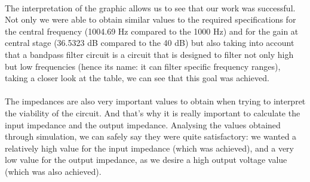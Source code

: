 \paragraph{}
The interpretation of the graphic allows us to see that our work was successful. Not only we were able to obtain similar values to the required specifications for the central frequency (1004.69 Hz compared to the 1000 Hz) and for the gain at central stage (36.5323 dB compared to the 40 dB) but also taking into account that a bandpass filter circuit is a circuit that is designed to filter not only high but low frequencies (hence its name: it can filter specific frequency ranges), taking a closer look at the table, we can see that this goal was achieved.

\paragraph{}
The impedances are also very important values to obtain when trying to interpret the viability of the circuit. And that's why it is really important to calculate the input impedance and the output impedance. Analysing the values obtained through simulation, we can safely say they were quite satisfactory: we wanted a relatively high value for the input impedance (which was achieved), and a very low value for the output impedance, as we desire a high output voltage value (which was also achieved).

